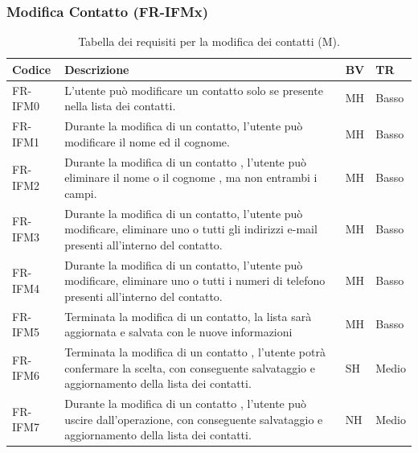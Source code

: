 \documentclass[a4paper,12pt]{article}
\begin{document}
    \subsubsection{Modifica Contatto (FR-IFMx)}
    \begin{table}[H]
        \centering
        \begin{tabular}{|l|p{8cm}|l|l|}
            \hline
            \textbf{Codice} & \textbf{Descrizione} & \textbf{BV} & \textbf{TR} \\
            \hline
            FR-IFM0 & L'utente può modificare un contatto solo se presente nella lista dei contatti. & MH & Basso \\
            \hline
            FR-IFM1 & Durante la modifica di un contatto, l'utente può modificare il nome ed il cognome.  & MH & Basso
            \\
            \hline
            FR-IFM2 & Durante la modifica di un contatto , l'utente può eliminare il nome o il cognome , ma non entrambi i campi. & MH & Basso
            \\
            \hline
            FR-IFM3 & Durante la modifica di un contatto, l'utente può modificare, eliminare uno o tutti gli indirizzi e-mail presenti all'interno del contatto.  & MH & Basso
            \\
            \hline
            FR-IFM4 & Durante la modifica di un contatto, l'utente può modificare, eliminare uno o tutti i numeri di telefono presenti all'interno del contatto. & MH & Basso
            \\
            \hline
            FR-IFM5 & Terminata la modifica di un contatto, la lista sarà aggiornata e salvata con le nuove informazioni & MH & Basso
            \\
            \hline
            FR-IFM6 & Terminata la modifica di un contatto , l'utente potrà confermare la scelta, con conseguente salvataggio e aggiornamento della lista dei contatti. & SH & Medio
            \\
            \hline
            FR-IFM7 & Durante la modifica di un contatto , l'utente può uscire dall'operazione, con conseguente salvataggio e aggiornamento della lista dei contatti. & NH & Medio
            \\
            \hline
        \end{tabular}
        \caption{Tabella dei requisiti per la modifica dei contatti (M).}
    \end{table}
    \nopagebreak
\end{document}

